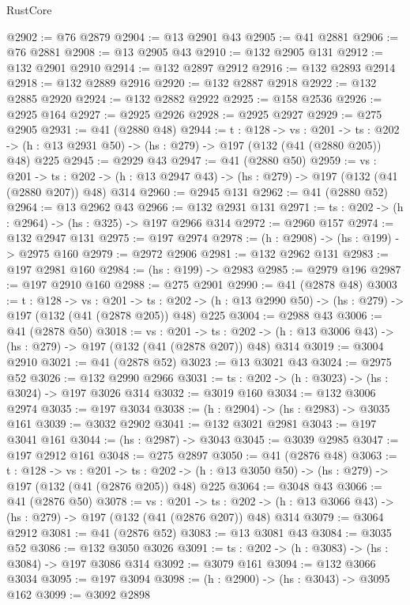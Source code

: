 \begin{lexlean}{RustCore}
\begin{coremodule}
@2902 := @76 @2879
@2904 := @13 @2901 @43
@2905 := @41 @2881
@2906 := @76 @2881
@2908 := @13 @2905 @43
@2910 := @132 @2905 @131
@2912 := @132 @2901 @2910
@2914 := @132 @2897 @2912
@2916 := @132 @2893 @2914
@2918 := @132 @2889 @2916
@2920 := @132 @2887 @2918
@2922 := @132 @2885 @2920
@2924 := @132 @2882 @2922
@2925 := @158 @2536
@2926 := @2925 @164
@2927 := @2925 @2926
@2928 := @2925 @2927
@2929 := @275 @2905
@2931 := @41 (@2880 @48)
@2944 := {t : @128} ->
  {vs : @201} ->
  {ts : @202} -> (h : @13 @2931 @50) -> (hs : @279) -> @197 (@132 (@41 (@2880 @205)) @48) @225
@2945 := @2929 @43
@2947 := @41 (@2880 @50)
@2959 := {vs : @201} ->
  {ts : @202} -> (h : @13 @2947 @43) -> (hs : @279) -> @197 (@132 (@41 (@2880 @207)) @48) @314
@2960 := @2945 @131
@2962 := @41 (@2880 @52)
@2964 := @13 @2962 @43
@2966 := @132 @2931 @131
@2971 := {ts : @202} -> (h : @2964) -> (hs : @325) -> @197 @2966 @314
@2972 := @2960 @157
@2974 := @132 @2947 @131
@2975 := @197 @2974
@2978 := (h : @2908) -> (hs : @199) -> @2975 @160
@2979 := @2972 @2906
@2981 := @132 @2962 @131
@2983 := @197 @2981 @160
@2984 := (hs : @199) -> @2983
@2985 := @2979 @196
@2987 := @197 @2910 @160
@2988 := @275 @2901
@2990 := @41 (@2878 @48)
@3003 := {t : @128} ->
  {vs : @201} ->
  {ts : @202} -> (h : @13 @2990 @50) -> (hs : @279) -> @197 (@132 (@41 (@2878 @205)) @48) @225
@3004 := @2988 @43
@3006 := @41 (@2878 @50)
@3018 := {vs : @201} ->
  {ts : @202} -> (h : @13 @3006 @43) -> (hs : @279) -> @197 (@132 (@41 (@2878 @207)) @48) @314
@3019 := @3004 @2910
@3021 := @41 (@2878 @52)
@3023 := @13 @3021 @43
@3024 := @2975 @52
@3026 := @132 @2990 @2966
@3031 := {ts : @202} -> (h : @3023) -> (hs : @3024) -> @197 @3026 @314
@3032 := @3019 @160
@3034 := @132 @3006 @2974
@3035 := @197 @3034
@3038 := (h : @2904) -> (hs : @2983) -> @3035 @161
@3039 := @3032 @2902
@3041 := @132 @3021 @2981
@3043 := @197 @3041 @161
@3044 := (hs : @2987) -> @3043
@3045 := @3039 @2985
@3047 := @197 @2912 @161
@3048 := @275 @2897
@3050 := @41 (@2876 @48)
@3063 := {t : @128} ->
  {vs : @201} ->
  {ts : @202} -> (h : @13 @3050 @50) -> (hs : @279) -> @197 (@132 (@41 (@2876 @205)) @48) @225
@3064 := @3048 @43
@3066 := @41 (@2876 @50)
@3078 := {vs : @201} ->
  {ts : @202} -> (h : @13 @3066 @43) -> (hs : @279) -> @197 (@132 (@41 (@2876 @207)) @48) @314
@3079 := @3064 @2912
@3081 := @41 (@2876 @52)
@3083 := @13 @3081 @43
@3084 := @3035 @52
@3086 := @132 @3050 @3026
@3091 := {ts : @202} -> (h : @3083) -> (hs : @3084) -> @197 @3086 @314
@3092 := @3079 @161
@3094 := @132 @3066 @3034
@3095 := @197 @3094
@3098 := (h : @2900) -> (hs : @3043) -> @3095 @162
@3099 := @3092 @2898

\end{coremodule}
\end{lexlean}
